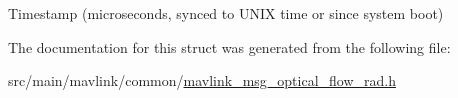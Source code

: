 Timestamp (microseconds, synced to U\+N\+I\+X time or since system boot) 



The documentation for this struct was generated from the following file\+:\begin{DoxyCompactItemize}
\item 
src/main/mavlink/common/\hyperlink{mavlink__msg__optical__flow__rad_8h}{mavlink\+\_\+msg\+\_\+optical\+\_\+flow\+\_\+rad.\+h}\end{DoxyCompactItemize}
